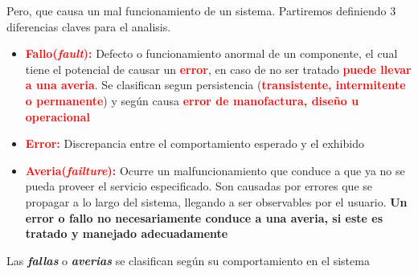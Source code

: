 Pero, que causa un mal funcionamiento de un sistema. Partiremos definiendo 3 diferencias claves para el analisis.

\begin{itemize}
    \item \textcolor{red}{\textbf{Fallo(\textit{fault}):}} Defecto o funcionamiento anormal de un componente, el cual tiene el potencial de causar un \textcolor{red}{\textbf{error}}, en caso de no ser tratado \textcolor{red}{\textbf{puede llevar a una averia}}. Se clasifican segun persistencia (\textcolor{red}{\textbf{transistente, intermitente o permanente}}) y según causa \textcolor{red}{\textbf{error de manofactura, diseño u operacional}} 
    \item \textcolor{red}{\textbf{Error:}} Discrepancia entre el comportamiento esperado y el exhibido
    \item \textcolor{red}{\textbf{Averia(\textit{failture}):}} Ocurre un malfuncionamiento que conduce a que ya no se pueda proveer el servicio especificado. Son causadas por errores que se propagar a lo largo del sistema, llegando a ser observables por el usuario.
    \subitem \textbf{Un error o fallo no necesariamente conduce a una averia, si este es tratado y manejado adecuadamente}
\end{itemize}

Las \textbf{\textit{fallas}} o \textbf{\textit{averias}} se clasifican según su comportamiento en el sistema

